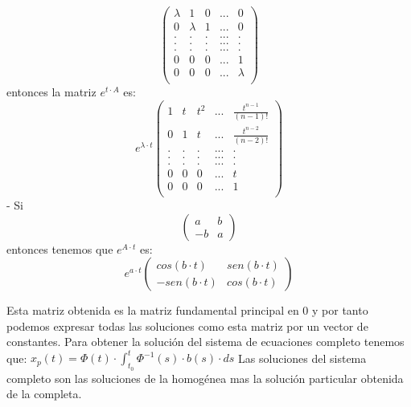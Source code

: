 \begin{sol}
$$\begin{pmatrix}
	\lambda & 1 & 0 & ... & 0 \\
	0 & \lambda & 1 & ... & 0 \\
	. & . & . & ... & . \\
	. & . & . & ... & . \\
	. & . & . & ... & . \\
	0 & 0 & 0 & ... & 1 \\
	0 & 0 & 0 & ... & \lambda \\
	\end{pmatrix}
	$$  
	entonces la matriz $e^{t\cdot A}$ es:  
	$$
	e^{\lambda \cdot t}
	\begin{pmatrix}
	1 & t & t^2 & ... & \frac{t^{n-1}}{(n-1)!} \\
	0 & 1 & t & ... & \frac{t^{n-2}}{(n-2)!} \\
	. & . & . & ... & . \\
	. & . & . & ... & . \\
	. & . & . & ... & . \\
	0 & 0 & 0 & ... & t \\
	0 & 0 & 0 & ... & 1 \\
	\end{pmatrix}
	$$
	- Si
	$$
	\begin{pmatrix}
	a & b \\
	-b & a
	\end{pmatrix}
	$$
	entonces tenemos que $e^{A\cdot t}$ es:
	$$
	e^{a\cdot t}
	\begin{pmatrix}
	cos(b\cdot t) & sen(b\cdot t) \\
	-sen(b\cdot t) & cos(b\cdot t)
	\end{pmatrix}
	$$
	
	Esta matriz obtenida es la matriz fundamental principal en 0 y por tanto podemos expresar todas las soluciones como esta matriz por un vector de constantes.  
	Para obtener la solución del sistema de ecuaciones completo tenemos que:  
	$x_p(t) = \Phi(t)\cdot \int_{t_0}^{t}\Phi^{-1}(s)\cdot b(s)\cdot ds$  
	Las soluciones del sistema completo son las soluciones de la homogénea mas la solución particular obtenida de la completa.
\end{sol}